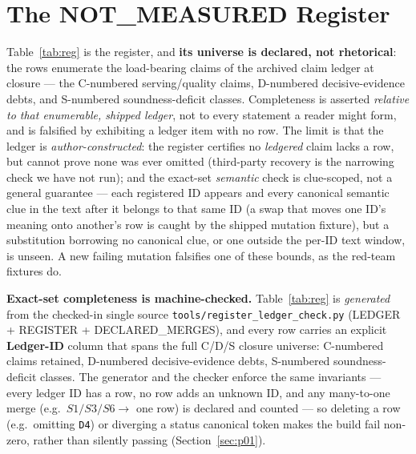 \documentclass{article}
\newcommand{\code}[1]{\texttt{#1}}
\begin{document}
\section{The NOT\_MEASURED Register}\label{sec:reg}
Table~\ref{tab:reg} is the register, and \textbf{its universe is declared, not rhetorical}: the
rows enumerate the load-bearing claims of the archived claim ledger at closure --- the C-numbered
serving/quality claims, D-numbered decisive-evidence debts, and S-numbered soundness-deficit
classes. Completeness is asserted \emph{relative to that enumerable, shipped ledger}, not to every
statement a reader might form, and is falsified by exhibiting a ledger item with no row. The limit
is that the ledger is \emph{author-constructed}: the register certifies no \emph{ledgered} claim
lacks a row, but cannot prove none was ever omitted (third-party recovery is the narrowing check
we have not run); and the exact-set \emph{semantic} check is clue-scoped, not a general
guarantee --- each registered ID appears and every canonical semantic clue in the text after it
belongs to that same ID (a swap that moves one ID's meaning onto another's row is caught by the
shipped mutation fixture), but a substitution borrowing no canonical clue, or one outside the
per-ID text window, is unseen. A new failing mutation falsifies one of these bounds, as the
red-team fixtures do.

\textbf{Exact-set completeness is machine-checked.} Table~\ref{tab:reg} is \emph{generated}
from the checked-in single source \code{tools/register\_ledger\_check.py} (LEDGER + REGISTER +
DECLARED\_MERGES), and every row carries an explicit \textbf{Ledger-ID} column that spans the
full C/D/S closure universe: C-numbered claims retained, D-numbered decisive-evidence debts,
S-numbered soundness-deficit classes. The generator and the checker enforce the same
invariants --- every ledger ID has a row, no row adds an unknown ID, and any many-to-one merge
(e.g.\ $S1{/}S3{/}S6 \rightarrow$ one row) is declared and counted --- so deleting a row (e.g.\
omitting \texttt{D4}) or diverging a status canonical token makes the build fail non-zero,
rather than silently passing (Section~\ref{sec:p01}).
\end{document}
